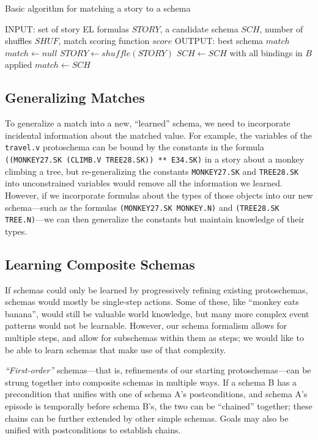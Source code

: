 \begin{algorithm}
\caption{Basic algorithm for matching a story to a schema}
\label{alg:matching}
\begin{algorithmic}
\STATE INPUT: set of story EL formulas $STORY$, a candidate schema $SCH$, number of shuffles $SHUF$, match scoring function $score$
\STATE OUTPUT: best schema $match$
\STATE $match \gets null$
    \STATE $STORY \gets shuffle(STORY)$
                \STATE $SCH \gets SCH$ with all bindings in $B$ applied
            \ENDIF
        \ENDFOR
    \ENDFOR
        \STATE $match \gets SCH$
    \ENDIF
\ENDFOR
\end{algorithmic}
\end{algorithm}

\subsection{Generalizing Matches}
To generalize a match into a new, ``learned'' schema, we need to incorporate incidental information about the matched value. For example, the variables of the \texttt{travel.v} protoschema can be bound by the constants in the formula \texttt{((MONKEY27.SK (CLIMB.V TREE28.SK)) ** E34.SK)} in a story about a monkey climbing a tree, but re-generalizing the constants \texttt{MONKEY27.SK} and \texttt{TREE28.SK} into unconstrained variables would remove all the information we learned. However, if we incorporate formulas about the types of those objects into our new schema---such as the formulas \texttt{(MONKEY27.SK MONKEY.N)} and \texttt{(TREE28.SK TREE.N)}---we can then generalize the constants but maintain knowledge of their types.

\subsection{Learning Composite Schemas}
If schemas could only be learned by progressively refining existing protoschemas, schemas would mostly be single-step actions. Some of these, like ``monkey eats banana'', would still be valuable world knowledge, but many more complex event patterns would not be learnable. However, our schema formalism allows for multiple steps, and allow for subschemas within them as steps; we would like to be able to learn schemas that make use of that complexity.

\textit{``First-order''} schemas---that is, refinements of our starting protoschemas---can be strung together into composite schemas in multiple ways. If a schema B has a precondition that unifies with one of schema A's postconditions, and schema A's episode is temporally before schema B's, the two can be ``chained'' together; these chains can be further extended by other simple schemas.
Goals may also be unified with postconditions to establish chains.
